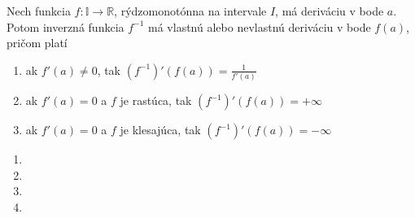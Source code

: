 \begin{veta}
Nech funkcia $f:\mathbb{I}\rightarrow\mathbb{R}$, rýdzomonotónna na intervale
$I$, má deriváciu v bode $a$. Potom inverzná funkcia $f^{-1}$ má vlastnú alebo
nevlastnú deriváciu v bode $f(a)$, pričom platí
\begin{enumerate}
\item ak $f'(a)\neq 0$, tak $(f^{-1})'(f(a))=\frac{1}{f'(a)}$
\item ak $f'(a)=0$ a $f$ je rastúca, tak $(f^{-1})'(f(a))=+\infty$
\item ak $f'(a)=0$ a $f$ je klesajúca, tak $(f^{-1})'(f(a))=-\infty$
\end{enumerate}
\end{veta}

\begin{enumerate}[resume]
  \item {}
  \item {}
  \item {}
  \item {}
\end{enumerate}